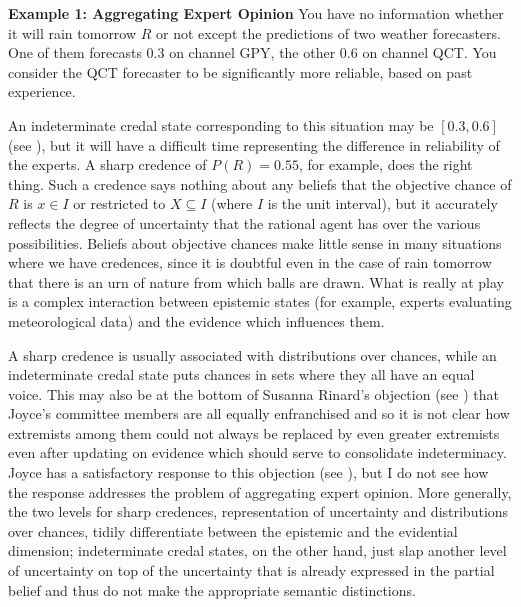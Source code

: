 \documentclass[11pt]{article}
\begin{document}
\begin{quotex}
  \textbf{Example 1: Aggregating Expert Opinion} You have no
  information whether it will rain tomorrow $R$ or not except the
  predictions of two weather forecasters. One of them forecasts 0.3 on
  channel GPY, the other 0.6 on channel QCT. You consider the QCT
  forecaster to be significantly more reliable, based on past
  experience.
\end{quotex}

An indeterminate credal state corresponding to this situation may be
$[0.3,0.6]$ (see ), but it will have a
difficult time representing the difference in reliability of the
experts. A sharp credence of $P(R)=0.55$, for example, does the right
thing. Such a credence says nothing about any beliefs that the
objective chance of $R$ is $x\in{}I$ or restricted to $X\subseteq{}I$
(where $I$ is the unit interval), but it accurately reflects the
degree of uncertainty that the rational agent has over the various
possibilities. Beliefs about objective chances make little sense in
many situations where we have credences, since it is doubtful even in
the case of rain tomorrow that there is an urn of nature from which
balls are drawn. What is really at play is a complex interaction
between epistemic states (for example, experts evaluating
meteorological data) and the evidence which influences them. 


A sharp credence is usually associated with distributions over
chances, while an indeterminate credal state puts chances in sets
where they all have an equal voice. This may also be at the bottom of
Susanna Rinard's objection (see ) that Joyce's
committee members are all equally enfranchised and so it is not clear
how extremists among them could not always be replaced by even greater
extremists even after updating on evidence which should serve to
consolidate indeterminacy. Joyce has a satisfactory response to this
objection (see ), but I do not see how the
response addresses the problem of aggregating expert opinion. More
generally, the two levels for sharp credences, representation of
uncertainty and distributions over chances, tidily differentiate
between the epistemic and the evidential dimension; indeterminate
credal states, on the other hand, just slap another level of
uncertainty on top of the uncertainty that is already expressed in the
partial belief and thus do not make the appropriate semantic
distinctions.
\end{document}
